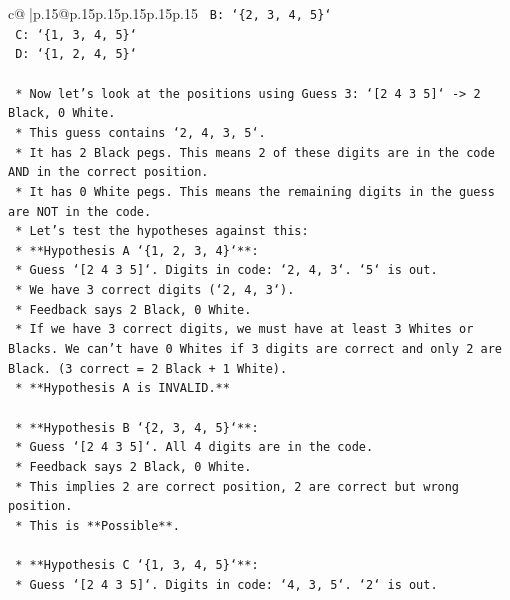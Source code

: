 \documentclass{article}
\begin{document}
{\begin{supertabular}{c@{$\;$}|p{.15\linewidth}@{}p{.15\linewidth}p{.15\linewidth}p{.15\linewidth}p{.15\linewidth}p{.15\linewidth}}
{{{\texttt{        B: `\{2, 3, 4, 5\}`} \\
\texttt{        C: `\{1, 3, 4, 5\}`} \\
\texttt{        D: `\{1, 2, 4, 5\}`} \\
\\ 
\texttt{    *   Now let's look at the positions using Guess 3: `{[}2 4 3 5{]}` {-}> 2 Black, 0 White.} \\
\texttt{        *   This guess contains `2, 4, 3, 5`.} \\
\texttt{        *   It has 2 Black pegs. This means 2 of these digits are in the code AND in the correct position.} \\
\texttt{        *   It has 0 White pegs. This means the remaining digits in the guess are NOT in the code.} \\
\texttt{        *   Let's test the hypotheses against this:} \\
\texttt{            *   **Hypothesis A `\{1, 2, 3, 4\}`**:} \\
\texttt{                *   Guess `{[}2 4 3 5{]}`. Digits in code: `2, 4, 3`. `5` is out.} \\
\texttt{                *   We have 3 correct digits (`2, 4, 3`).} \\
\texttt{                *   Feedback says 2 Black, 0 White.} \\
\texttt{                *   If we have 3 correct digits, we must have at least 3 Whites or Blacks. We can't have 0 Whites if 3 digits are correct and only 2 are Black. (3 correct = 2 Black + 1 White).} \\
\texttt{                *   **Hypothesis A is INVALID.**} \\
\\ 
\texttt{            *   **Hypothesis B `\{2, 3, 4, 5\}`**:} \\
\texttt{                *   Guess `{[}2 4 3 5{]}`. All 4 digits are in the code.} \\
\texttt{                *   Feedback says 2 Black, 0 White.} \\
\texttt{                *   This implies 2 are correct position, 2 are correct but wrong position.} \\
\texttt{                *   This is **Possible**.} \\
\\ 
\texttt{            *   **Hypothesis C `\{1, 3, 4, 5\}`**:} \\
\texttt{                *   Guess `{[}2 4 3 5{]}`. Digits in code: `4, 3, 5`. `2` is out.} \\
}}}
\end{supertabular}}
\end{document}
